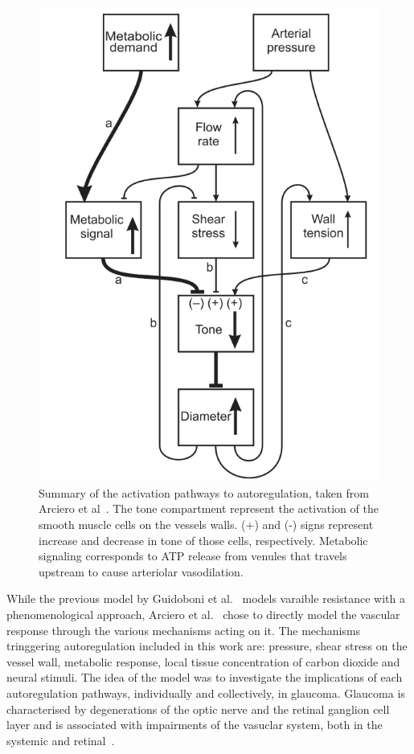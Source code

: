 \documentclass[12pt,a4paper]{article}
\begin{document}
\begin{figure}[!ht]
  \centering
  \includegraphics[width=.9\textwidth]{SummaryAutoregulationPathways}
  \caption{Summary of the activation pathways to autoregulation, taken from Arciero et al~\cite{Arciero_2008}. The tone compartment represent the activation of the smooth muscle cells on the vessels walls. (+) and (-) signs represent increase and decrease in tone of those cells, respectively. Metabolic signaling corresponds to ATP release from venules that travels upstream to cause arteriolar vasodilation.}
  \label{fig:Autoregulation-Summary}
\end{figure}

While the previous model by Guidoboni et al.~\cite{Guidoboni_2014b} models varaible resistance with a phenomenological approach, Arciero et al.~\cite{Arciero_2013} chose to directly model the vascular response through the various mechanisms acting on it.
The mechanisms tringgering autoregulation included in this work are: pressure, shear stress on the vessel wall, metabolic response, local tissue concentration of carbon dioxide and neural stimuli.
The idea of the model was to investigate the implications of each autoregulation pathways, individually and collectively, in glaucoma.
Glaucoma is characterised by degenerations of the optic nerve and the retinal ganglion cell layer and is associated with impairments of the vasuclar system, both in the systemic and retinal~\cite{Hulsman_2007, Bonomi_2000}.
\end{document}
